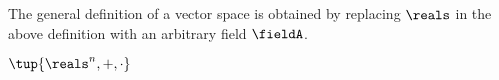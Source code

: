 \begin{remark}
The general definition of a vector space is obtained by replacing $\reals$ in the above definition with an arbitrary field $\fieldA$. 
\end{remark}

\begin{example}
$\tup{\reals^n, +, \cdot}$
\end{example}



